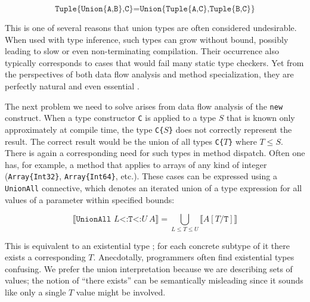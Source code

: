 \vspace{-3ex}
\[
\texttt{Tuple\{Union\{A,B\},C\}} = \texttt{Union\{Tuple\{A,C\},Tuple\{B,C\}\}}
\]

This is one of several reasons that union types are often considered undesirable.
When used with type inference, such types can grow without bound, possibly leading
to slow or even non-terminating compilation.
Their occurrence also typically corresponds to cases that would fail many static type
checkers.
Yet from the perspectives of both data flow analysis and method specialization, they
are perfectly natural and even essential
\cite{abstractinterp, Igarashi, Smith:2008:JTI:1449764.1449804}.

The next problem we need to solve arises from data flow analysis of
the \texttt{new} construct.
When a type constructor \texttt{C} is applied to a type
$S$ that is known only approximately at compile time, the type \texttt{C\{}$S$\texttt{\}}
does not correctly represent the result.
The correct result would be the union of all types \texttt{C\{}$T$\texttt{\}}
where $T\leq S$.
There is again a corresponding need for such types in method dispatch.
Often one has, for example, a method that applies to arrays of any
kind of integer (\texttt{Array\{Int32\}}, \texttt{Array\{Int64\}}, etc.).
These cases can be expressed using a \texttt{UnionAll} connective, which denotes
an iterated union of a type expression for all values of a parameter within
specified bounds:

\vspace{-3ex}
\[
  \llbracket \texttt{UnionAll }L\texttt{<:T<:}U\ A \rrbracket = \bigcup_{L \leq T \leq U} \llbracket A[T/\texttt{T}] \rrbracket
\]


This is equivalent to an existential type \cite{boundedquant};
for each concrete subtype of it there exists a corresponding $T$.
Anecdotally, programmers often find existential types confusing.
We prefer the union interpretation because we are describing sets of values;
the notion of ``there exists'' can be semantically misleading since it sounds like
only a single $T$ value might be involved.


